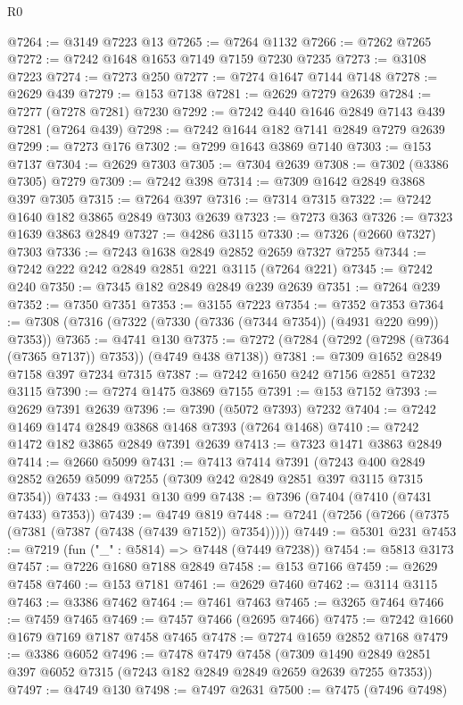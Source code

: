 \begin{lexlean}{R0}
\begin{coremodule}
@7264 := @3149 @7223 @13
@7265 := @7264 @1132
@7266 := @7262 @7265
@7272 := @7242 @1648 @1653 @7149 @7159 @7230 @7235
@7273 := @3108 @7223
@7274 := @7273 @250
@7277 := @7274 @1647 @7144 @7148
@7278 := @2629 @439
@7279 := @153 @7138
@7281 := @2629 @7279 @2639
@7284 := @7277 (@7278 @7281) @7230
@7292 := @7242 @440 @1646 @2849 @7143 @439 @7281 (@7264 @439)
@7298 := @7242 @1644 @182 @7141 @2849 @7279 @2639
@7299 := @7273 @176
@7302 := @7299 @1643 @3869 @7140
@7303 := @153 @7137
@7304 := @2629 @7303
@7305 := @7304 @2639
@7308 := @7302 (@3386 @7305) @7279
@7309 := @7242 @398
@7314 := @7309 @1642 @2849 @3868 @397 @7305
@7315 := @7264 @397
@7316 := @7314 @7315
@7322 := @7242 @1640 @182 @3865 @2849 @7303 @2639
@7323 := @7273 @363
@7326 := @7323 @1639 @3863 @2849
@7327 := @4286 @3115
@7330 := @7326 (@2660 @7327) @7303
@7336 := @7243 @1638 @2849 @2852 @2659 @7327 @7255
@7344 := @7242 @222 @242 @2849 @2851 @221 @3115 (@7264 @221)
@7345 := @7242 @240
@7350 := @7345 @182 @2849 @2849 @239 @2639
@7351 := @7264 @239
@7352 := @7350 @7351
@7353 := @3155 @7223
@7354 := @7352 @7353
@7364 := @7308 (@7316 (@7322 (@7330 (@7336 (@7344 @7354)) (@4931 @220 @99)) @7353))
@7365 := @4741 @130
@7375 := @7272 (@7284 (@7292 (@7298 (@7364 (@7365 @7137)) @7353)) (@4749 @438 @7138))
@7381 := @7309 @1652 @2849 @7158 @397 @7234 @7315
@7387 := @7242 @1650 @242 @7156 @2851 @7232 @3115
@7390 := @7274 @1475 @3869 @7155
@7391 := @153 @7152
@7393 := @2629 @7391 @2639
@7396 := @7390 (@5072 @7393) @7232
@7404 := @7242 @1469 @1474 @2849 @3868 @1468 @7393 (@7264 @1468)
@7410 := @7242 @1472 @182 @3865 @2849 @7391 @2639
@7413 := @7323 @1471 @3863 @2849
@7414 := @2660 @5099
@7431 := @7413
    @7414
    @7391
    (@7243 @400 @2849 @2852 @2659 @5099 @7255 (@7309 @242 @2849 @2851 @397 @3115 @7315 @7354))
@7433 := @4931 @130 @99
@7438 := @7396 (@7404 (@7410 (@7431 @7433) @7353))
@7439 := @4749 @819
@7448 := @7241 (@7256 (@7266 (@7375 (@7381 (@7387 (@7438 (@7439 @7152)) @7354)))))
@7449 := @5301 @231
@7453 := @7219 (fun ("_" : @5814) => @7448 (@7449 @7238))
@7454 := @5813 @3173
@7457 := @7226 @1680 @7188 @2849
@7458 := @153 @7166
@7459 := @2629 @7458
@7460 := @153 @7181
@7461 := @2629 @7460
@7462 := @3114 @3115
@7463 := @3386 @7462
@7464 := @7461 @7463
@7465 := @3265 @7464
@7466 := @7459 @7465
@7469 := @7457 @7466 (@2695 @7466)
@7475 := @7242 @1660 @1679 @7169 @7187 @7458 @7465
@7478 := @7274 @1659 @2852 @7168
@7479 := @3386 @6052
@7496 := @7478
    @7479
    @7458
    (@7309 @1490 @2849 @2851 @397 @6052 @7315 (@7243 @182 @2849 @2849 @2659 @2639 @7255 @7353))
@7497 := @4749 @130
@7498 := @7497 @2631
@7500 := @7475 (@7496 @7498)

\end{coremodule}
\end{lexlean}
